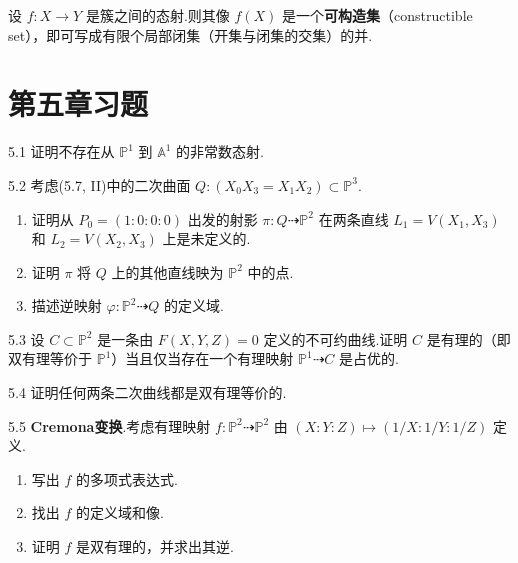 \begin{theorem}[Chevalley]
设 \(f: X \to Y\) 是簇之间的态射.则其像 \(f(X)\) 是一个\textbf{可构造集}（constructible set），即可写成有限个局部闭集（开集与闭集的交集）的并.
\end{theorem}

\section{第五章习题}

5.1 证明不存在从 \({\mathbb{P}}^1\) 到 \({\mathbb{A}}^1\) 的非常数态射.

5.2 考虑(5.7, II)中的二次曲面 \(Q: (X_0X_3 = X_1X_2) \subset {\mathbb{P}}^3\).

\begin{enumerate}
    \item[\upshape (a)] 证明从 \(P_0 = (1:0:0:0)\) 出发的射影 \(\pi: Q \dashrightarrow {\mathbb{P}}^2\) 在两条直线 \(L_1 = V(X_1, X_3)\) 和 \(L_2 = V(X_2, X_3)\) 上是未定义的.

    \item[\upshape (b)] 证明 \(\pi\) 将 \(Q\) 上的其他直线映为 \({\mathbb{P}}^2\) 中的点.

    \item[\upshape (c)] 描述逆映射 \(\varphi: {\mathbb{P}}^2 \dashrightarrow Q\) 的定义域.
\end{enumerate}

5.3 设 \(C \subset {\mathbb{P}}^2\) 是一条由 \(F(X,Y,Z)=0\) 定义的不可约曲线.证明 \(C\) 是有理的（即双有理等价于 \({\mathbb{P}}^1\)）当且仅当存在一个有理映射 \({\mathbb{P}}^1 \dashrightarrow C\) 是占优的.

5.4 证明任何两条二次曲线都是双有理等价的.

5.5 \textbf{Cremona变换}.考虑有理映射 \(f: {\mathbb{P}}^2 \dashrightarrow {\mathbb{P}}^2\) 由 \((X:Y:Z) \mapsto (1/X : 1/Y : 1/Z)\) 定义.

\begin{enumerate}
    \item[\upshape (a)] 写出 \(f\) 的多项式表达式.

    \item[\upshape (b)] 找出 \(f\) 的定义域和像.

    \item[\upshape (c)] 证明 \(f\) 是双有理的，并求出其逆.
\end{enumerate}
